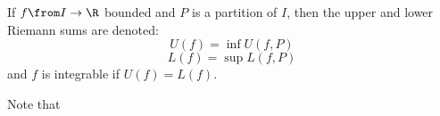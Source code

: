 \documentclass{article}
\begin{document}

\begin{defn}
  If $f \from I \to \R$ bounded and $P$ is a partition of $I$, then the upper and lower Riemann sums are denoted:
  \[ U(f) = \inf U(f, P) \]
  \[ L(f) = \sup L(f, P) \]
  and $f$ is integrable if $U(f) = L(f)$.
\end{defn}

\begin{defn}
  Note that
\end{defn}
\end{document}
